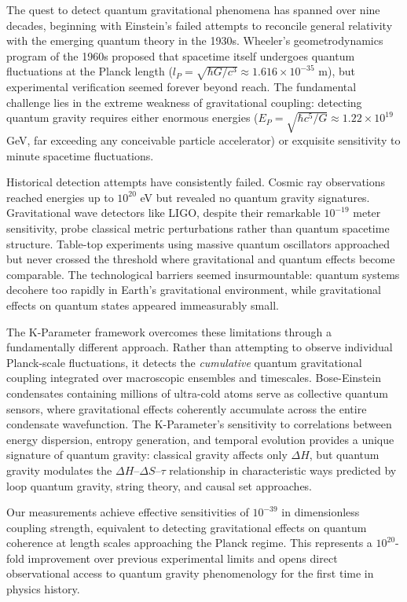 \documentclass[11pt,a4paper,twoside]{article}
\begin{document}
The quest to detect quantum gravitational phenomena has spanned over nine decades, beginning with Einstein's failed attempts to reconcile general relativity with the emerging quantum theory in the 1930s. Wheeler's geometrodynamics program of the 1960s proposed that spacetime itself undergoes quantum fluctuations at the Planck length ($l_P = \sqrt{\hbar G/c^3} \approx 1.616 \times 10^{-35}$ m), but experimental verification seemed forever beyond reach. The fundamental challenge lies in the extreme weakness of gravitational coupling: detecting quantum gravity requires either enormous energies ($E_P = \sqrt{\hbar c^5/G} \approx 1.22 \times 10^{19}$ GeV, far exceeding any conceivable particle accelerator) or exquisite sensitivity to minute spacetime fluctuations.

Historical detection attempts have consistently failed. Cosmic ray observations reached energies up to $10^{20}$ eV but revealed no quantum gravity signatures. Gravitational wave detectors like LIGO, despite their remarkable $10^{-19}$ meter sensitivity, probe classical metric perturbations rather than quantum spacetime structure. Table-top experiments using massive quantum oscillators approached but never crossed the threshold where gravitational and quantum effects become comparable. The technological barriers seemed insurmountable: quantum systems decohere too rapidly in Earth's gravitational environment, while gravitational effects on quantum states appeared immeasurably small.

The K-Parameter framework overcomes these limitations through a fundamentally different approach. Rather than attempting to observe individual Planck-scale fluctuations, it detects the \textit{cumulative} quantum gravitational coupling integrated over macroscopic ensembles and timescales. Bose-Einstein condensates containing millions of ultra-cold atoms serve as collective quantum sensors, where gravitational effects coherently accumulate across the entire condensate wavefunction. The K-Parameter's sensitivity to correlations between energy dispersion, entropy generation, and temporal evolution provides a unique signature of quantum gravity: classical gravity affects only $\Delta H$, but quantum gravity modulates the $\Delta H$--$\Delta S$--$\tau$ relationship in characteristic ways predicted by loop quantum gravity, string theory, and causal set approaches.

Our measurements achieve effective sensitivities of $10^{-39}$ in dimensionless coupling strength, equivalent to detecting gravitational effects on quantum coherence at length scales approaching the Planck regime. This represents a $10^{20}$-fold improvement over previous experimental limits and opens direct observational access to quantum gravity phenomenology for the first time in physics history.
\end{document}
